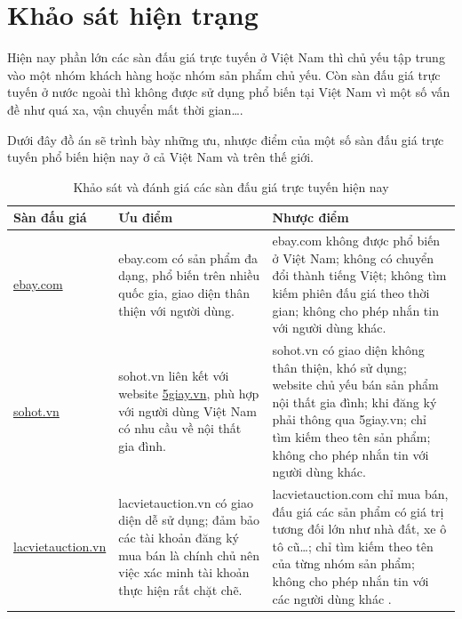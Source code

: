 \documentclass[../DoAn.tex]{subfiles}
\begin{document}
\section{Khảo sát hiện trạng}
\label{section:2.1}
Hiện nay phần lớn các sàn đấu giá trực tuyến ở Việt Nam thì chủ yếu tập trung vào một nhóm khách hàng hoặc nhóm sản phẩm chủ yếu. Còn sàn đấu giá trực tuyến ở nước ngoài thì không được sử dụng phổ biến tại Việt Nam vì một số vấn đề như quá xa, vận chuyển mất thời gian….

Dưới đây đồ án sẽ trình bày những ưu, nhược điểm của một số sàn đấu giá trực tuyến phổ biến hiện nay ở cả Việt Nam và trên thế giới.

    \begin{longtable}{| p{} | p{} | p{} |} 
        \caption{Khảo sát và đánh giá các sàn đấu giá trực tuyến hiện nay}
        \label{bang21}
        \endfirsthead
        \endhead
        \hline
        \bfseries Sàn đấu giá & \bfseries Ưu điểm &  \bfseries Nhược điểm\\\hline
        \href{https://www.ebay.com/}{ebay.com} &  ebay.com có sản phẩm đa dạng, phổ biến trên nhiều quốc gia, giao diện thân thiện với người dùng.
        &  ebay.com không được phổ biến ở Việt Nam; không có chuyển đổi thành tiếng Việt; không tìm kiếm phiên đấu giá theo thời gian; không cho phép nhắn tin với người dùng khác.\\\hline
        \href{https://sohot.vn/}{sohot.vn} &  sohot.vn liên kết với website \href{https://www.5giay.vn/}{5giay.vn}, phù hợp với người dùng Việt Nam có nhu cầu về nội thất gia đình.&  sohot.vn có giao diện không thân thiện, khó sử dụng; website chủ yếu bán sản phẩm nội thất gia đình; khi đăng ký phải thông qua 5giay.vn; chỉ tìm kiếm theo tên sản phẩm; không cho phép nhắn tin với người dùng khác.\\\hline
        \href{https://lacvietauction.vn/}{lacvietauction.vn} & lacvietauction.vn có giao diện dễ sử dụng; đảm bảo các tài khoản đăng ký mua bán là chính chủ nên việc xác minh tài khoản thực hiện rất chặt chẽ. & lacvietauction.com chỉ mua bán, đấu giá các sản phẩm có giá trị tương đối lớn như nhà đất, xe ô tô cũ…; chỉ tìm kiếm theo tên của từng nhóm sản phẩm; không cho phép nhắn tin với các người dùng khác .\\\hline
    \end{longtable}
\end{document}
